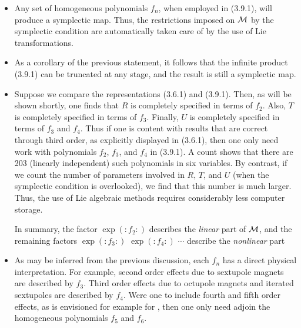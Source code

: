 \begin{itemize}
  \item  Any set of homogeneous polynomials $f_n$,  when employed in  (3.9.1),
         will produce a symplectic map.  Thus, the restrictions  imposed on
         ${\cal M}$ by the symplectic condition are automatically  taken care of by
         the use of Lie transformations.

  \item  As a corollary of the previous statement, it follows that the
         infinite product (3.9.1) can be truncated at any stage, and the
         result is still a symplectic map.

  \item  Suppose we compare the representations (3.6.1) and (3.9.1).
         Then, as will be shown shortly, one finds that $R$ is completely
         specified in terms of $f_2$.  Also, $T$ is completely specified in
         terms of $f_3$.  Finally, $U$ is completely specified in terms of $f_3$
         and $f_4$.  Thus if one is content with results that are correct
         through third order, as explicitly displayed in (3.6.1), then  one
         only need work with polynomials $f_2$, $f_3$, and $f_4$  in (3.9.1).   A
         count shows that there are 203 (linearly independent) such
         polynomials in six variables.  By contrast, if we count the
         number of parameters involved in $R$, $T$, and $U$ (when the  symplectic
         condition is overlooked), we find that this number  is much
         larger.  Thus, the use of Lie algebraic methods requires
         considerably less computer storage.   

In summary, the factor $\exp (:f_2:)$ describes the {\em linear} part  of ${\cal M}$, and the remaining factors $\exp (:f_3:)$ $\exp (:f_4:)$ $\cdots$ describe the {\em nonlinear} part 

  \item  As may be inferred from the previous discussion, each $f_n$  has a
         direct physical interpretation.  For example, second order
         effects due to sextupole magnets are described by $f_3$.  Third
         order effects due to octupole magnets and iterated sextupoles  are
         described by $f_4$.  Were one to include fourth and fifth order
         effects, as is envisioned for example for , then one
         only need adjoin the homogeneous polynomials $f_5$  and $f_6$.
\end{itemize}

